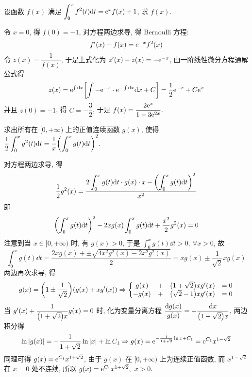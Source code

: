 \begin{example}[2023 四川大学]
    设函数 $f(x)$ 满足 $\displaystyle\int_{0}^{x}f^2(t)\dd t=\mathrm{e} ^xf(x)+1$, 求 $f(x).$
\end{example}
\begin{solution}
    令 $x=0$, 得 $f(0)=-1$, 对方程两边求导, 得 Bernoulli 方程:
    $$f'(x)+f(x)=\mathrm{e} ^{-x}f^2(x)$$
    令 $z(x)=\dfrac{1}{f(x)}$, 于是上式化为 $z'(x)-z(x)=-\mathrm{e} ^{-x}$, 由一阶线性微分方程通解公式得
    $$z(x)=\mathrm{e} ^{\int\dd x}\qty[\int-\mathrm{e} ^{-x}\cdot\mathrm{e} ^{-\int\dd x}\dd x+C]=\dfrac{1}{2}\mathrm{e} ^{-x}+C\mathrm{e} ^x$$
    并且 $z(0)=-1$, 得 $C=-\dfrac{3}{2}$, 于是 $f(x)=\dfrac{2\mathrm{e} ^{x}}{1-3\mathrm{e} ^{2x}}.$
\end{solution}

\begin{example}
    求出所有在 $[0,+\infty)$ 上的正值连续函数 $g(x)$, 使得 $\displaystyle\dfrac{1}{2}\int_{0}^{x}g^2(t)\dd t=\dfrac{1}{x}\qty(\int_{0}^{x}g(t)\dd t)^2.$
\end{example}
\begin{solution}
    对方程两边求导, 得 $$\dfrac{1}{2}g^2(x)=\dfrac{2\displaystyle\int_{0}^{x}g(t)\dd t\cdot g(x)\cdot x-\qty(\displaystyle\int_{0}^{x}g(t)\dd t)^2}{x^2}$$
    即 $$\qty(\int_{0}^{x}g(t)\dd t)^2-2xg(x)\int_{0}^{x}g(t)\dd t+\dfrac{x^2}{2}g^2(x)=0$$
    注意到当 $x\in[0,+\infty)$ 时, 有 $g(x)>0$, 于是 $\displaystyle\int_{0}^{x}g(t)\dd t>0,~\forall x>0$, 
    故 $$\int_{0}^{x}g(t)\dd t=\dfrac{2xg(x)+\pm\sqrt{4x^2g^2(x)-2x^2g^2(x)}}{2}=xg(x)\pm\dfrac{1}{\sqrt{2}}xg(x)$$
    两边再次求导, 得 $$g(x)=\qty(1\pm\dfrac{1}{\sqrt{2}})(g(x)+xg'(x))\Rightarrow\left\{\begin{matrix}
            g(x)  & + & \qty(1+\sqrt2)xg'(x) & =0 \\
            -g(x) & + & \qty(\sqrt2-1)xg'(x) & =0
        \end{matrix}\right.$$
    当 $g'(x)+\dfrac{1}{\qty(1+\sqrt{2})x}g(x)=0$ 时, 化为变量分离方程 $\dfrac{\dd g(x)}{g(x)}=-\dfrac{\dd x}{\qty(1+\sqrt{2})x}$, 两边积分得
    $$\ln|g(x)|=-\dfrac{1}{1+\sqrt{2}}\ln|x|+\ln C_1\Rightarrow g(x)=\mathrm{e} ^{-\frac{1}{1+\sqrt2}\ln x+C_1}=\mathrm{e} ^{C_1}x^{1-\sqrt2}$$
    同理可得 $g(x)=\mathrm{e} ^{C_1}x^{1+\sqrt2}$, 由于 $g(x)$ 在 $[0,+\infty)$ 上为连续正值函数, 而 $x^{1-\sqrt2}$ 在 $x=0$ 处不连续, 所以 $g(x)=\mathrm{e} ^{C_1}x^{1+\sqrt2},~x>0.$
\end{solution}

